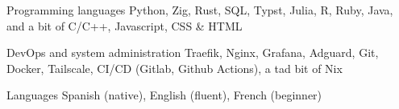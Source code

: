 

\begin{cvskills}

  \cvskill
    {Programming languages}
    {Python, Zig, Rust, SQL, Typst, Julia, R, Ruby, Java, and a bit of C/C++, Javascript, CSS \& HTML} %

  \cvskill
    {DevOps and system administration} %
    {Traefik, Nginx, Grafana, Adguard, Git, Docker, Tailscale, CI/CD (Gitlab, Github Actions), a tad bit of Nix} %

  \cvskill
    {Languages} %
    {Spanish (native), English (fluent), French (beginner)} %

\end{cvskills}
